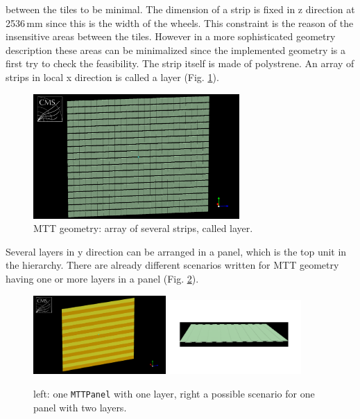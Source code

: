			between the tiles to be minimal.
			The dimension of a strip is fixed in z direction at 2536\,mm since this is the width of the wheels.
			This constraint is the reason of the insensitive areas between the tiles.
			However in a more sophisticated geometry description these areas can be minimalized since the implemented geometry is a first try to check the feasibility. 
			The strip itself is made of polystrene.
			An array of strips in local x direction is called a layer (Fig. \ref{fig:layer}).
			\begin{figure}[htbp]
				\centering
				\includegraphics[width=0.70\textwidth]{Figures/erdogan/layer.png}
				\caption{MTT geometry: array of several strips, called layer.}
				\label{fig:layer}
			\end{figure}
			Several layers in y direction can be arranged in a panel, which is the top unit in the hierarchy.
			There are already different scenarios written for MTT geometry having one or more layers in a panel (Fig. \ref{fig:panel}).
			\begin{figure}[htbp]
				\centering
				\includegraphics[width=0.45\textwidth]{Figures/erdogan/panel1.png}
				\includegraphics[width=0.45\textwidth]{Figures/erdogan/panel2.png}
				\caption{left: one \verb+MTTPanel+ with one layer, right a possible scenario for one panel with two layers.}
				\label{fig:panel}
			\end{figure}
